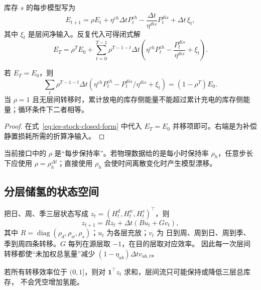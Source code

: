 库存 $s$ 的每步模型写为
\begin{equation}
 E_{t+1}=\rho E_t+\eta^{ch}\Delta t P_t^{ch}
 -\frac{\Delta t}{\eta^{dis}}P_t^{dis}+\Delta t\,\xi_t,
 \label{eq:ies-stock-recursion-expanded}
\end{equation}
其中 $\xi_t$ 是层间净输入。反复代入可得闭式解
\begin{equation}
 E_T=\rho^T E_0+\sum_{t=0}^{T-1}\rho^{T-1-t}\Delta t
 \left(\eta^{ch}P_t^{ch}-\frac{P_t^{dis}}{\eta^{dis}}+\xi_t\right).
 \label{eq:ies-stock-closed-form}
\end{equation}

\begin{proposition}[循环边界下的损耗恒等式]
若 $E_T=E_0$，则
\begin{equation}
 \sum_t\rho^{T-1-t}\Delta t
 \left(\eta^{ch}P_t^{ch}-P_t^{dis}/\eta^{dis}+\xi_t\right)
 =(1-\rho^T)E_0 .
 \label{eq:ies-cyclic-loss-identity}
\end{equation}
当 $\rho=1$ 且无层间转移时，累计放电的库存侧能量不能超过累计充电的库存侧能量；循环条件下二者相等。
\end{proposition}
\begin{proof}
在式~\eqref{eq:ies-stock-closed-form} 中代入 $E_T=E_0$ 并移项即可。右端是为补偿
静置损耗所需的折算净输入。
\end{proof}

当前接口中的 $\rho$ 是“每步保持率”。若物理数据给的是每小时保持率 $\rho_h$，任意步长下应使用
$\rho=\rho_h^{\Delta t}$；直接使用 $\rho_h$ 会使时间离散变化时产生模型漂移。

\subsection{分层储氢的状态空间}

把日、周、季三层状态写成 $z_t=(H_t^d,H_t^w,H_t^s)^\top$，则
\begin{equation}
 z_{t+1}=Rz_t+\Delta t(Bu_t+Gv_t),
 \label{eq:ies-layered-state}
\end{equation}
其中 $R=\operatorname{diag}(\rho_d,\rho_w,\rho_s)$；$u_t$ 为各层充放；$v_t$ 为
日到周、周到日、周到季、季到周四条转移。$G$ 每列在源层取 $-1$，在目的层取对应效率。
因此每一次层间转移都使“未加权总氢量”减少
$(1-\eta_{ab})\Delta t v_{ab,t}$。

\begin{corollary}[层间转移不创造能量]
若所有转移效率位于 $(0,1]$，则对 $\mathbf 1^\top z_t$ 求和，层间流只可能保持或降低三层总库存，
不会凭空增加氢能。
\end{corollary}

